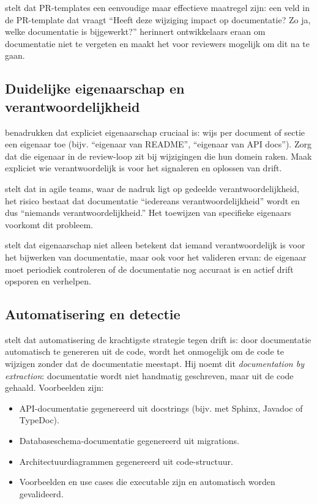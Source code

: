 \textcite{gentle2017docslikecode} stelt dat PR-templates een eenvoudige maar effectieve maatregel zijn: een veld in de PR-template dat vraagt ``Heeft deze wijziging impact op documentatie? Zo ja, welke documentatie is bijgewerkt?'' herinnert ontwikkelaars eraan om documentatie niet te vergeten en maakt het voor reviewers mogelijk om dit na te gaan.

\subsection{Duidelijke eigenaarschap en verantwoordelijkheid}
\textcite{bhatti2021docsdevelopers} benadrukken dat expliciet eigenaarschap cruciaal is: wijs per document of sectie een eigenaar toe (bijv. ``eigenaar van README'', ``eigenaar van API docs''). Zorg dat die eigenaar in de review-loop zit bij wijzigingen die hun domein raken. Maak expliciet wie verantwoordelijk is voor het signaleren en oplossen van drift.

\textcite{ruping2005agiledocumentation} stelt dat in agile teams, waar de nadruk ligt op gedeelde verantwoordelijkheid, het risico bestaat dat documentatie ``iedereans verantwoordelijkheid'' wordt en dus ``niemands verantwoordelijkheid.'' Het toewijzen van specifieke eigenaars voorkomt dit probleem.

\textcite{martraire2019livingdocumentation} stelt dat eigenaarschap niet alleen betekent dat iemand verantwoordelijk is voor het bijwerken van documentatie, maar ook voor het valideren ervan: de eigenaar moet periodiek controleren of de documentatie nog accuraat is en actief drift opsporen en verhelpen.

\subsection{Automatisering en detectie}
\textcite{martraire2019livingdocumentation} stelt dat automatisering de krachtigste strategie tegen drift is: door documentatie automatisch te genereren uit de code, wordt het onmogelijk om de code te wijzigen zonder dat de documentatie meestapt. Hij noemt dit \textit{documentation by extraction}: documentatie wordt niet handmatig geschreven, maar uit de code gehaald. Voorbeelden zijn:

\begin{itemize}
    \item API-documentatie gegenereerd uit docstrings (bijv. met Sphinx, Javadoc of TypeDoc).
    \item Databaseschema-documentatie gegenereerd uit migrations.
    \item Architectuurdiagrammen gegenereerd uit code-structuur.
    \item Voorbeelden en use cases die executable zijn en automatisch worden gevalideerd.
\end{itemize}

